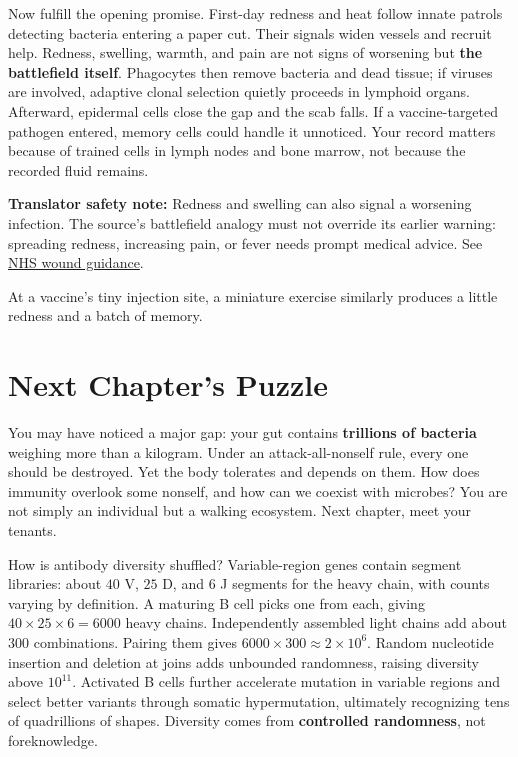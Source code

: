 Now fulfill the opening promise. First-day redness and heat follow innate patrols detecting bacteria entering a paper cut. Their signals widen vessels and recruit help. Redness, swelling, warmth, and pain are not signs of worsening but \textbf{the battlefield itself}. Phagocytes then remove bacteria and dead tissue; if viruses are involved, adaptive clonal selection quietly proceeds in lymphoid organs. Afterward, epidermal cells close the gap and the scab falls. If a vaccine-targeted pathogen entered, memory cells could handle it unnoticed. Your record matters because of trained cells in lymph nodes and bone marrow, not because the recorded fluid remains.

\textbf{Translator safety note:} Redness and swelling can also signal a worsening infection. The source's battlefield analogy must not override its earlier warning: spreading redness, increasing pain, or fever needs prompt medical advice. See \href{https://www.nhs.uk/conditions/cuts-and-grazes/}{NHS wound guidance}.

At a vaccine's tiny injection site, a miniature exercise similarly produces a little redness and a batch of memory.

\section{Next Chapter's Puzzle}

You may have noticed a major gap: your gut contains \textbf{trillions of bacteria} weighing more than a kilogram. Under an attack-all-nonself rule, every one should be destroyed. Yet the body tolerates and depends on them. How does immunity overlook some nonself, and how can we coexist with microbes? You are not simply an individual but a walking ecosystem. Next chapter, meet your tenants.

\begin{tiaozhan}
How is antibody diversity shuffled? Variable-region genes contain segment libraries: about $40$ V, $25$ D, and $6$ J segments for the heavy chain, with counts varying by definition. A maturing B cell picks one from each, giving $40\times 25\times 6=6000$ heavy chains. Independently assembled light chains add about $300$ combinations. Pairing them gives $6000\times 300\approx 2\times 10^{6}$. Random nucleotide insertion and deletion at joins adds unbounded randomness, raising diversity above $10^{11}$. Activated B cells further accelerate mutation in variable regions and select better variants through somatic hypermutation, ultimately recognizing tens of quadrillions of shapes. Diversity comes from \textbf{controlled randomness}, not foreknowledge.
\end{tiaozhan}

